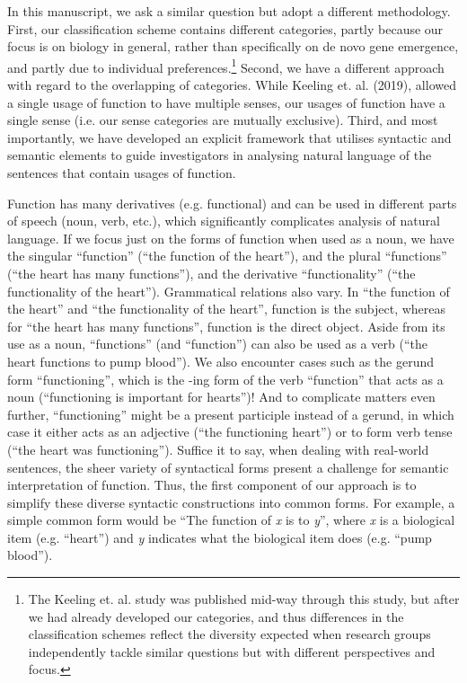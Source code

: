 \documentclass{article}
\begin{document}
In this manuscript, we ask a similar question but adopt a different methodology.
First, our classification scheme contains different categories, partly because our focus is on biology in general, rather than specifically on de novo gene emergence, and partly due to individual preferences.\footnote{The Keeling et. al. study was published mid-way through this study, but after we had already developed our categories, and thus differences in the classification schemes reflect the diversity expected when research groups independently tackle similar questions but with different perspectives and focus.}
Second, we have a different approach with regard to the overlapping of categories.
While Keeling et. al. (2019), allowed a single usage of function to have multiple senses, our usages of function have a single sense (i.e. our sense categories are mutually exclusive).
Third, and most importantly, we have developed an explicit framework that utilises syntactic and semantic elements to guide investigators in analysing natural language of the sentences that contain usages of function.

Function has many derivatives (e.g. functional) and can be used in different parts of speech (noun, verb, etc.), which significantly complicates analysis of natural language.
If we focus just on the forms of function when used as a noun, we have the singular ``function'' (``the function of the heart''), and the plural ``functions'' (``the heart has many functions''), and the derivative ``functionality'' (``the functionality of the heart'').
Grammatical relations also vary.
In ``the function of the heart'' and ``the functionality of the heart'', function is the subject, whereas for ``the heart has many functions'', function is the direct object.
Aside from its use as a noun, ``functions'' (and ``function'') can also be used as a verb (``the heart functions to pump blood'').
We also encounter cases such as the gerund form ``functioning'', which is the -ing form of the verb ``function'' that acts as a noun (``functioning is important for hearts'')!
And to complicate matters even further, ``functioning'' might be a present participle instead of a gerund, in which case it either acts as an adjective (``the functioning heart'') or to form verb tense (``the heart was functioning''). Suffice it to say, when dealing with real-world sentences, the sheer variety of syntactical forms present a challenge for semantic interpretation of function.
Thus, the first component of our approach is to simplify these diverse syntactic constructions into common forms.
For example, a simple common form would be ``The function of \emph{x} is to \emph{y}'', where \emph{x} is a biological item (e.g. ``heart'') and \emph{y} indicates what the biological item does (e.g. ``pump blood'').
\end{document}

